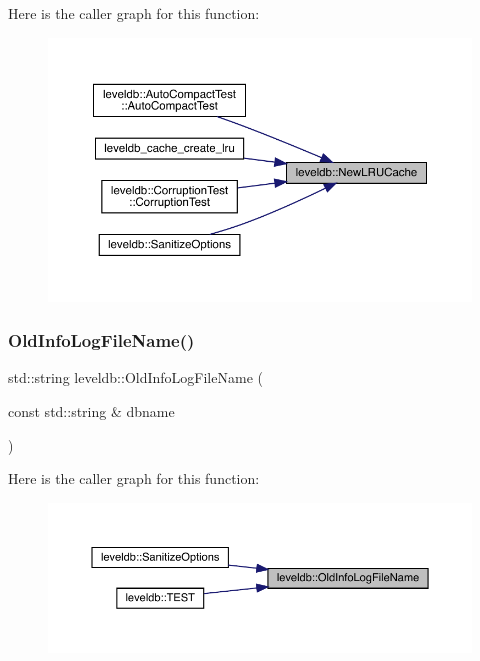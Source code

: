 Here is the caller graph for this function\+:
\nopagebreak
\begin{figure}[H]
\begin{center}
\leavevmode
\includegraphics[width=350pt]{namespaceleveldb_a05f8130d07c05f6ffab639fe4da0e9e8_icgraph}
\end{center}
\end{figure}
\mbox{\label{namespaceleveldb_a2964797a29cbda9d37cce54109eefdc6}} 
\subsubsection{\texorpdfstring{OldInfoLogFileName()}{OldInfoLogFileName()}}
{\footnotesize\ttfamily std\+::string leveldb\+::\+Old\+Info\+Log\+File\+Name (\begin{DoxyParamCaption}\item[{const std\+::string \&}]{dbname }\end{DoxyParamCaption})}

Here is the caller graph for this function\+:
\nopagebreak
\begin{figure}[H]
\begin{center}
\leavevmode
\includegraphics[width=350pt]{namespaceleveldb_a2964797a29cbda9d37cce54109eefdc6_icgraph}
\end{center}
\end{figure}
\mbox{\label{namespaceleveldb_a6592a36834e5a52b66cc8357c7ef806b}} 
